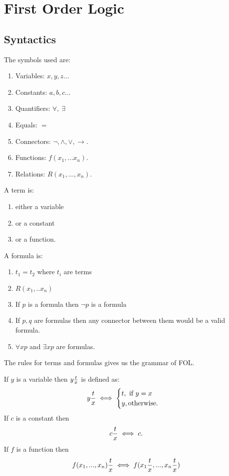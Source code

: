 \section{First Order Logic}
\subsection{Syntactics}
\begin{definition}  
The symbols used are:
\begin{enumerate}
  \item Variables: $x,y,z...$
  \item Constants: $a,b,c...$
  \item Quantifiers: $\forall,\ \exists$
  \item Equals: $=$
  \item Connectors: $\lnot, \land,\lor, \to$.
  \item Functions: $f(x_1,...x_n)$.
  \item Relations: $R(x_1,...,x_n)$.
\end{enumerate}
\end{definition}
\begin{definition}
  A term is:
  \begin{enumerate}
    \item either a variable
    \item or a constant
    \item or a function.
  \end{enumerate}
\end{definition}
\begin{definition}
  A formula is:
  \begin{enumerate}
    \item $t_1=t_2$ where $t_i$ are terms
    \item $R(x_1,..x_n)$
    \item If $p$ is a formula then $\lnot p$ is a formula
    \item If $p,q$ are formulas then any connector between them would be a valid formula.
    \item $\forall xp$ and $\exists xp$ are formulas.
  \end{enumerate}
\end{definition}
The rules for terms and formulas gives us the grammar of FOL.
\begin{definition}
    If $y$ is a variable then $y\frac{t}{x}$ is defined as:
    \begin{align*}
      y\frac{t}{x} \iff \begin{cases}
        t ,\ \text{if $y=x$}\\
        y, \text{otherwise}. 
      \end{cases}
    \end{align*}
    If $c$ is a constant then
    \begin{align*}
      c\frac{t}{x} \iff c.
    \end{align*}
    If $f$ is a function then 
    \begin{align*}
      f(x_1,...,x_n)\frac{t}{x} \iff f(x_1\frac{t}{x},...,x_n\frac{t}{x}) 
    \end{align*}
\end{definition}
